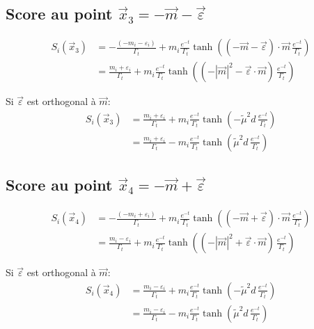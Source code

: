 \documentclass[11pt,a4paper]{article}
\begin{document}
\subsection{Score au point $\vec{x}_3 = -\vec{m} - \vec{\varepsilon}$}

\begin{align}
S_i(\vec{x}_3) &= -\frac{(-m_i - \varepsilon_i)}{\Gamma_t}+m_i \frac{e^{-t}}{\Gamma_t}\tanh\left( (-\vec{m} - \vec{\varepsilon}) \cdot \vec{m} \, \frac{e^{-t}}{\Gamma_t}\right) \\
&= \frac{m_i + \varepsilon_i}{\Gamma_t}+m_i \frac{e^{-t}}{\Gamma_t}\tanh\left( (-|\vec{m}|^2 - \vec{\varepsilon} \cdot \vec{m}) \, \frac{e^{-t}}{\Gamma_t}\right)
\end{align}

Si $\vec{\varepsilon}$ est orthogonal à $\vec{m}$:
\begin{align}
S_i(\vec{x}_3) &= \frac{m_i + \varepsilon_i}{\Gamma_t}+m_i \frac{e^{-t}}{\Gamma_t}\tanh\left( -\tilde{\mu}^2 d \, \frac{e^{-t}}{\Gamma_t}\right) \\
&= \frac{m_i + \varepsilon_i}{\Gamma_t}-m_i \frac{e^{-t}}{\Gamma_t}\tanh\left( \tilde{\mu}^2 d \, \frac{e^{-t}}{\Gamma_t}\right)
\end{align}

\subsection{Score au point $\vec{x}_4 = -\vec{m} + \vec{\varepsilon}$}

\begin{align}
S_i(\vec{x}_4) &= -\frac{(-m_i + \varepsilon_i)}{\Gamma_t}+m_i \frac{e^{-t}}{\Gamma_t}\tanh\left( (-\vec{m} + \vec{\varepsilon}) \cdot \vec{m} \, \frac{e^{-t}}{\Gamma_t}\right) \\
&= \frac{m_i - \varepsilon_i}{\Gamma_t}+m_i \frac{e^{-t}}{\Gamma_t}\tanh\left( (-|\vec{m}|^2 + \vec{\varepsilon} \cdot \vec{m}) \, \frac{e^{-t}}{\Gamma_t}\right)
\end{align}

Si $\vec{\varepsilon}$ est orthogonal à $\vec{m}$:
\begin{align}
S_i(\vec{x}_4) &= \frac{m_i - \varepsilon_i}{\Gamma_t}+m_i \frac{e^{-t}}{\Gamma_t}\tanh\left( -\tilde{\mu}^2 d \, \frac{e^{-t}}{\Gamma_t}\right) \\
&= \frac{m_i - \varepsilon_i}{\Gamma_t}-m_i \frac{e^{-t}}{\Gamma_t}\tanh\left( \tilde{\mu}^2 d \, \frac{e^{-t}}{\Gamma_t}\right)
\end{align}
\end{document}
